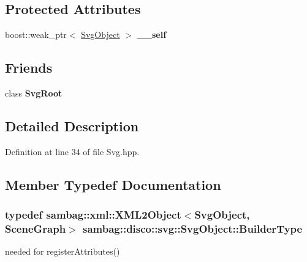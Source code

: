 \subsection*{Protected Attributes}
\begin{DoxyCompactItemize}
\item 
\hypertarget{classsambag_1_1disco_1_1svg_1_1_svg_object_ac6c7d567167fb17b0193c66a2c8be983}{
boost::weak\_\-ptr$<$ \hyperlink{classsambag_1_1disco_1_1svg_1_1_svg_object}{SvgObject} $>$ {\bfseries \_\-\_\-self}}
\label{classsambag_1_1disco_1_1svg_1_1_svg_object_ac6c7d567167fb17b0193c66a2c8be983}

\end{DoxyCompactItemize}
\subsection*{Friends}
\begin{DoxyCompactItemize}
\item 
\hypertarget{classsambag_1_1disco_1_1svg_1_1_svg_object_ab89a83cbd54d4b219c848f7c7ef96422}{
class {\bfseries SvgRoot}}
\label{classsambag_1_1disco_1_1svg_1_1_svg_object_ab89a83cbd54d4b219c848f7c7ef96422}

\end{DoxyCompactItemize}


\subsection{Detailed Description}


Definition at line 34 of file Svg.hpp.



\subsection{Member Typedef Documentation}
\hypertarget{classsambag_1_1disco_1_1svg_1_1_svg_object_af28e33e92eb4e235101d9f4a66c69a6f}{
\subsubsection[{BuilderType}]{\setlength{\rightskip}{0pt plus 5cm}typedef {\bf sambag::xml::XML2Object}$<${\bf SvgObject}, {\bf SceneGraph}$>$ {\bf sambag::disco::svg::SvgObject::BuilderType}}}
\label{classsambag_1_1disco_1_1svg_1_1_svg_object_af28e33e92eb4e235101d9f4a66c69a6f}
needed for registerAttributes() 

